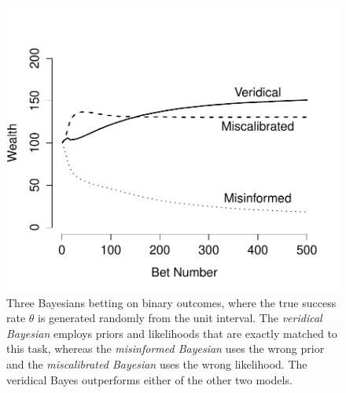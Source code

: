 \documentclass[doc,floatsintext]{apa6}
\begin{document}
\begin{figure}[t]
	\centering
	\small
	\hspace*{.5cm}
	\includegraphics[width=.33\textwidth]{other_figs/threeBayes.pdf}
	\vspace*{6pt}
	\caption{Three Bayesians betting on binary outcomes, where the true success rate $\theta$ is generated randomly from the unit interval. The {\it veridical Bayesian} employs priors and likelihoods that are exactly matched to this task, whereas the {\it misinformed Bayesian} uses the wrong prior and the {\it miscalibrated Bayesian} uses the wrong likelihood. The veridical Bayes outperforms either of the other two models.}
	\label{fig:threeBayes}
	\vspace*{-3mm}
\end{figure}
\end{document}
